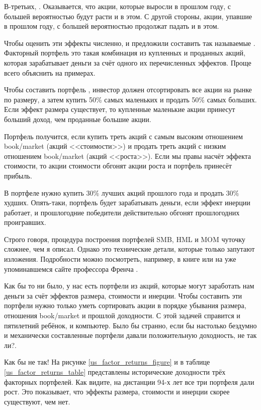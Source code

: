 В-третьих, . Оказывается, что акции, которые выросли в прошлом году, с большей вероятностью будут расти и в этом. С другой стороны, акции, упавшие в прошлом году, с большей вероятностью продолжат падать и в этом.

Чтобы оценить эти эффекты численно,  и  предложили составить так называемые . Факторный портфель это такая комбинация из купленных и проданных акций, которая зарабатывает деньги за счёт одного их перечисленных эффектов. Проще всего объяснить на примерах.

Чтобы составить портфель , инвестор должен отсортировать все акции на рынке по размеру, а затем купить 50\% самых маленьких и продать 50\% самых больших. Если эффект размера существует, то купленные маленькие акции принесут больший доход, чем проданные большие акции.

Портфель  получится, если купить треть акций с самым высоким отношением book/market (акций <<стоимости>>) и продать треть акций с низким отношением book/market (акций <<роста>>). Если мы правы насчёт эффекта стоимости, то акции стоимости обгонят акции роста и портфель принесёт прибыль.

В портфеле  нужно купить 30\% лучших акций прошлого года и продать 30\% худших. Опять-таки, портфель будет зарабатывать деньги, если эффект инерции работает, и прошлогодние победители действительно обгонят прошлогодних проигравших.

Строго говоря, процедура построения портфелей SMB, HML и MOM чуточку сложнее, чем я описал. Однако это технические детали, которые только запутают изложения. Подробности можно посмотреть, например, в книге \cite[ch.~9--11]{bali2016empirical} или на уже упоминавшемся сайте профессора Френча \cite{kennethFrench}.

Как бы то ни было, у нас есть портфели из акций, которые могут заработать нам деньги за счёт эффектов размера, стоимости и инерции. Чтобы составить эти портфели нужно только уметь сортировать акции в порядке убывания размера, отношения book/market и прошлой доходности. С этой задачей справится и пятилетний ребёнок, и компьютер. Было бы странно, если бы настолько бездумно и механически составленные портфели давали положительную доходность, не так ли?.

Как бы не так! На рисунке \ref{us_factor_returns_figure} и в таблице \ref{us_factor_returns_table} представлены исторические доходности трёх факторных портфелей. Как видите, на дистанции 94-х лет все три портфеля дали рост. Это показывает, что эффекты размера, стоимости и инерции скорее существуют, чем нет.

